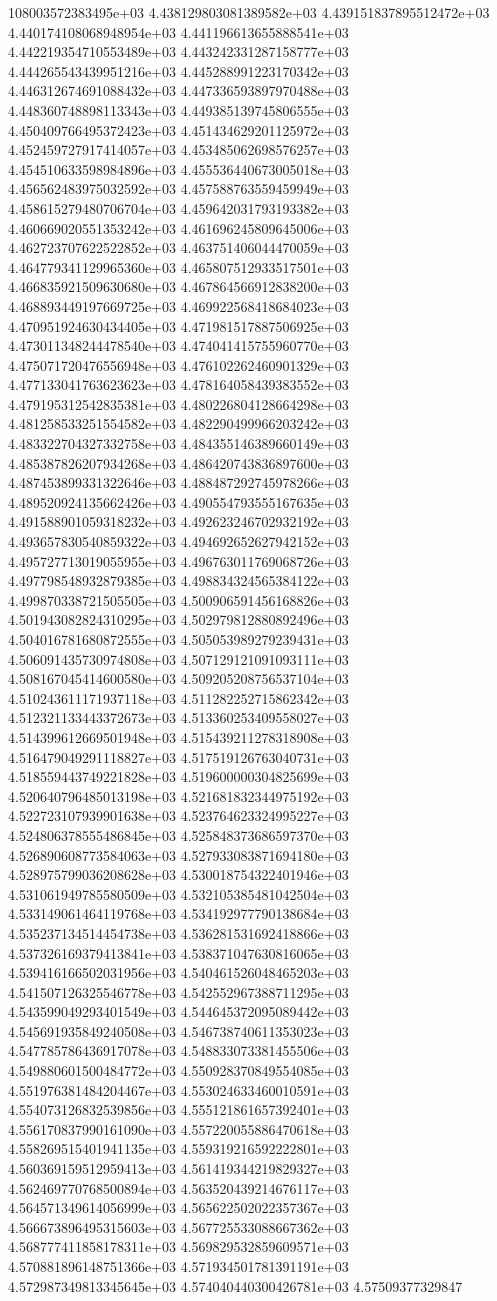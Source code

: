 108003572383495e+03	4.438129803081389582e+03	4.439151837895512472e+03	4.440174108068948954e+03	4.441196613655888541e+03	4.442219354710553489e+03	4.443242331287158777e+03	4.444265543439951216e+03	4.445288991223170342e+03	4.446312674691088432e+03	4.447336593897970488e+03	4.448360748898113343e+03	4.449385139745806555e+03	4.450409766495372423e+03	4.451434629201125972e+03	4.452459727917414057e+03	4.453485062698576257e+03	4.454510633598984896e+03	4.455536440673005018e+03	4.456562483975032592e+03	4.457588763559459949e+03	4.458615279480706704e+03	4.459642031793193382e+03	4.460669020551353242e+03	4.461696245809645006e+03	4.462723707622522852e+03	4.463751406044470059e+03	4.464779341129965360e+03	4.465807512933517501e+03	4.466835921509630680e+03	4.467864566912838200e+03	4.468893449197669725e+03	4.469922568418684023e+03	4.470951924630434405e+03	4.471981517887506925e+03	4.473011348244478540e+03	4.474041415755960770e+03	4.475071720476556948e+03	4.476102262460901329e+03	4.477133041763623623e+03	4.478164058439383552e+03	4.479195312542835381e+03	4.480226804128664298e+03	4.481258533251554582e+03	4.482290499966203242e+03	4.483322704327332758e+03	4.484355146389660149e+03	4.485387826207934268e+03	4.486420743836897600e+03	4.487453899331322646e+03	4.488487292745978266e+03	4.489520924135662426e+03	4.490554793555167635e+03	4.491588901059318232e+03	4.492623246702932192e+03	4.493657830540859322e+03	4.494692652627942152e+03	4.495727713019055955e+03	4.496763011769068726e+03	4.497798548932879385e+03	4.498834324565384122e+03	4.499870338721505505e+03	4.500906591456168826e+03	4.501943082824310295e+03	4.502979812880892496e+03	4.504016781680872555e+03	4.505053989279239431e+03	4.506091435730974808e+03	4.507129121091093111e+03	4.508167045414600580e+03	4.509205208756537104e+03	4.510243611171937118e+03	4.511282252715862342e+03	4.512321133443372673e+03	4.513360253409558027e+03	4.514399612669501948e+03	4.515439211278318908e+03	4.516479049291118827e+03	4.517519126763040731e+03	4.518559443749221828e+03	4.519600000304825699e+03	4.520640796485013198e+03	4.521681832344975192e+03	4.522723107939901638e+03	4.523764623324995227e+03	4.524806378555486845e+03	4.525848373686597370e+03	4.526890608773584063e+03	4.527933083871694180e+03	4.528975799036208628e+03	4.530018754322401946e+03	4.531061949785580509e+03	4.532105385481042504e+03	4.533149061464119768e+03	4.534192977790138684e+03	4.535237134514454738e+03	4.536281531692418866e+03	4.537326169379413841e+03	4.538371047630816065e+03	4.539416166502031956e+03	4.540461526048465203e+03	4.541507126325546778e+03	4.542552967388711295e+03	4.543599049293401549e+03	4.544645372095089442e+03	4.545691935849240508e+03	4.546738740611353023e+03	4.547785786436917078e+03	4.548833073381455506e+03	4.549880601500484772e+03	4.550928370849554085e+03	4.551976381484204467e+03	4.553024633460010591e+03	4.554073126832539856e+03	4.555121861657392401e+03	4.556170837990161090e+03	4.557220055886470618e+03	4.558269515401941135e+03	4.559319216592222801e+03	4.560369159512959413e+03	4.561419344219829327e+03	4.562469770768500894e+03	4.563520439214676117e+03	4.564571349614056999e+03	4.565622502022357367e+03	4.566673896495315603e+03	4.567725533088667362e+03	4.568777411858178311e+03	4.569829532859609571e+03	4.570881896148751366e+03	4.571934501781391191e+03	4.572987349813345645e+03	4.574040440300426781e+03	4.57509377329847
